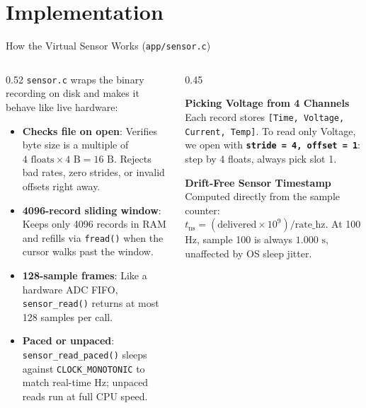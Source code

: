 \systemOverviewSlide

\clientFlowchartSlide

\serverFlowchartSlide

\dataFlowSlide

\section{Implementation}

\begin{frame}{How the Virtual Sensor Works (\texttt{app/sensor.c})}
  \begin{columns}[t, onlytextwidth]
    \begin{column}{0.52\textwidth}
      \smalltext\compactitem
      \texttt{sensor.c} wraps the binary recording on disk and makes it behave like live hardware:
      \begin{itemize}
        \item \textbf{Checks file on open}: Verifies byte size is a multiple of $4\text{ floats} \times 4\text{ B} = 16\text{ B}$. Rejects bad rates, zero strides, or invalid offsets right away.
        \item \textbf{4096-record sliding window}: Keeps only 4096 records in RAM and refills via \texttt{fread()} when the cursor walks past the window.
        \item \textbf{128-sample frames}: Like a hardware ADC FIFO, \texttt{sensor\_read()} returns at most 128 samples per call.
        \item \textbf{Paced or unpaced}: \texttt{sensor\_read\_paced()} sleeps against \texttt{CLOCK\_MONOTONIC} to match real-time Hz; unpaced reads run at full CPU speed.
      \end{itemize}
    \end{column}
    \begin{column}{0.45\textwidth}
      \smalltext\compactitem
      \begin{highlight}
        \textbf{Picking Voltage from 4 Channels} \\
        Each record stores \texttt{[Time, Voltage, Current, Temp]}. To read only Voltage, we open with \textbf{\texttt{stride = 4, offset = 1}}: step by 4 floats, always pick slot 1.
      \end{highlight}
      \vskip0.5mm
      \begin{tech}
        \textbf{Drift-Free Sensor Timestamp} \\
        Computed directly from the sample counter:
        $t_{\text{ns}} = (\text{delivered} \times 10^9) / \text{rate\_hz}$.
        At 100 Hz, sample 100 is always $1.000\text{ s}$, unaffected by OS sleep jitter.
      \end{tech}
    \end{column}
  \end{columns}
\end{frame}


